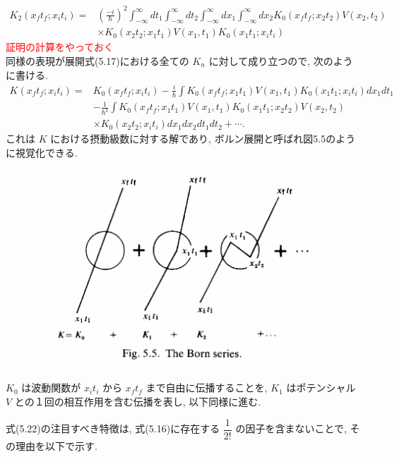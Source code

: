 \documentclass[a4paper,12pt]{article}
\begin{document}
\begin{align*}
    K_{2}(x_{f}t_{f}; x_{i}t_{i}) = &\left( \frac{-i}{\hbar} \right)^2 \int_{-\infty}^{\infty} dt_1 \int_{-\infty}^{\infty} dt_2 \int_{-\infty}^{\infty} dx_1 \int_{-\infty}^{\infty}dx_2 K_{0}(x_{f}t_{f}; x_{2}t_{2})V(x_{2}, t_{2}) \\
    & \times K_{0}(x_{2}t_{2}; x_{1}t_{1})V(x_{1}, t_{1})K_{0}(x_{1}t_{1}; x_{i}t_{i}) \tag{5.22}
\end{align*}
\textcolor{red}{証明の計算をやっておく}\\
同様の表現が展開式(5.17)における全ての $K_n$ に対して成り立つので, 次のように書ける.
\begin{align*}
    K(x_f t_f; x_i t_i) = &K_0(x_f t_f; x_i t_i) - \frac{i}{\hbar} \int K_0(x_f t_f; x_1 t_1)V(x_1, t_1)K_0(x_1 t_1; x_i t_i)dx_1 dt_1\\
    & - \frac{1}{\hbar^2}\int K_0(x_f t_f; x_1 t_1)V(x_1, t_1)K_0(x_1 t_1; x_2 t_2)V(x_2, t_2)\\
    & \times K_0(x_2 t_2; x_i t_i)dx_1 dx_2 dt_1 dt_2 + \cdots. \tag{5.23}
\end{align*}
これは $K$ における摂動級数に対する解であり, ボルン展開と呼ばれ図5.5のように視覚化できる.
\begin{figure}[H]
    \centering
    \includegraphics[width=\textwidth]{figure/fig5-5.png}    
\end{figure}
$K_0$ は波動関数が $x_{i}t_{i}$ から $x_{f}t_{f}$ まで自由に伝播することを, $K_1$ はポテンシャル $V$ との１回の相互作用を含む伝播を表し, 以下同様に進む.\par
式(5.22)の注目すべき特徴は, 式(5.16)に存在する $\dfrac{1}{2!}$ の因子を含まないことで, その理由を以下で示す.\\
\end{document}
